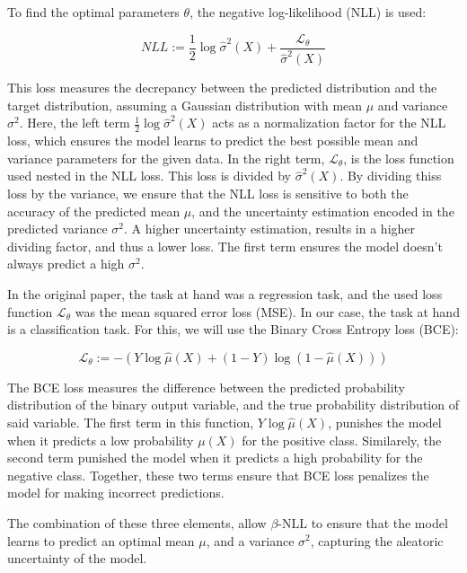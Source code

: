 To find the optimal parameters $\theta$, the negative log-likelihood (NLL) is used:

\begin{equation}
    NLL := \frac{1}{2}\log \hat{\sigma}^2(X) + \frac{\mathcal{L}_\theta}{\hat{\sigma}^2(X)}
\end{equation}

This loss measures the decrepancy between the predicted distribution and the target distribution, assuming a Gaussian distribution with mean $\mu$ and variance $\sigma^2$. Here, the left term $\frac{1}{2}\log \hat{\sigma}^2(X)$ acts as a normalization factor for the NLL loss, which ensures the model learns to predict the best possible mean and variance parameters for the given data. In the right term, $\mathcal{L}_\theta$, is the loss function used nested in the NLL loss. This loss is divided by $\hat{\sigma}^2(X)$. By dividing thiss loss by the variance, we ensure that the NLL loss is sensitive to both the accuracy of the predicted mean $\mu$, and the uncertainty estimation encoded in the predicted variance $\sigma^2$. A higher uncertainty estimation, results in a higher dividing factor, and thus a lower loss. The first term ensures the model doesn't always predict a high $\sigma^2$.

In the original paper, the task at hand was a regression task, and the used loss function $\mathcal{L}_\theta$ was the mean squared error loss (MSE). In our case, the task at hand is a classification task. For this, we will use the Binary Cross Entropy loss (BCE):

\begin{equation}
    \mathcal{L}_\theta := - ( Y \log \hat{\mu}(X) + (1 - Y) \log (1 - \hat{\mu}(X)) )
\end{equation}

The BCE loss measures the difference between the predicted probability distribution of the binary output variable, and the true probability distribution of said variable. The first term in this function, $Y \log \hat{\mu}(X)$, punishes the model when it predicts a low probability $\mu(X)$ for the positive class. Similarely, the second term punished the model when it predicts a high probability for the negative class. Together, these two terms ensure that BCE loss penalizes the model for making incorrect predictions.

The combination of these three elements, allow $\beta$-NLL to ensure that the model learns to predict an optimal mean $\mu$, and a variance $\sigma^2$, capturing the aleatoric uncertainty of the model.


